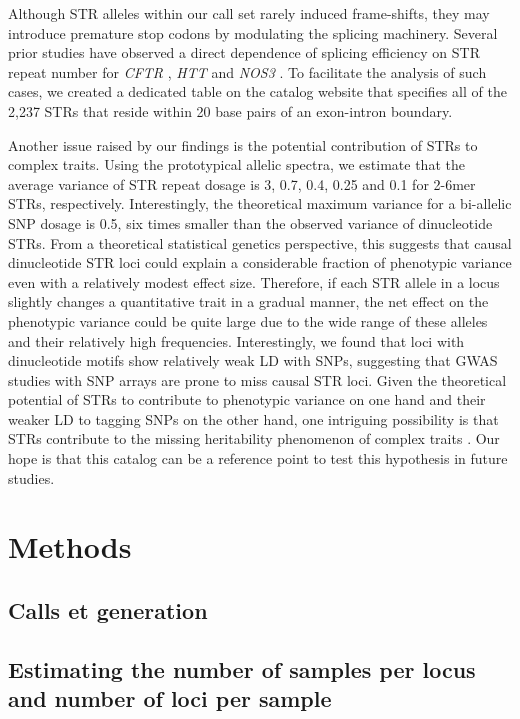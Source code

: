 Although STR alleles within our call set rarely induced frame-shifts, they may introduce premature stop codons by modulating the splicing machinery. Several prior studies have observed a direct dependence of splicing efficiency on STR repeat number for \emph{CFTR} \cite{HefferonGromanYurkEtAl2004}, \emph{HTT} \cite{SathasivamNeuederGipsonEtAl2013} and \emph{NOS3} \cite{HuiStanglLaneEtAl2003}. To facilitate the analysis of such cases, we created a dedicated table on the catalog website that specifies all of the 2,237 STRs that reside within 20 base pairs of an exon-intron boundary.  

Another issue raised by our findings is the potential contribution of STRs to complex traits. Using the prototypical allelic spectra, we estimate that the average variance of STR repeat dosage is 3, 0.7, 0.4, 0.25 and 0.1 for 2-6mer STRs, respectively. Interestingly, the theoretical maximum variance for a bi-allelic SNP dosage is 0.5, six times smaller than the observed variance of dinucleotide STRs. From a theoretical statistical genetics perspective, this suggests that causal dinucleotide STR loci could explain a considerable fraction of phenotypic variance even with a relatively modest effect size. Therefore, if each STR allele in a locus slightly changes a quantitative trait in a gradual manner, the net effect on the phenotypic variance could be quite large due to the wide range of these alleles and their relatively high frequencies. Interestingly, we found that loci with dinucleotide motifs show relatively weak LD with SNPs, suggesting that GWAS studies with SNP arrays are prone to miss causal STR loci. Given the theoretical potential of STRs to contribute to phenotypic variance on one hand and their weaker LD to tagging SNPs on the other hand, one intriguing possibility is that STRs contribute to the missing heritability phenomenon of complex traits \cite{ManolioCollinsCoxEtAl2009,PressCarlsonQueitsch2014}. Our hope is that this catalog can be a reference point to test this hypothesis in future studies.  


\section{Methods}
\label{sec:catmet}
\subsection{Calls et generation}
\subsection{Estimating the number of samples per locus and number of loci per sample}
